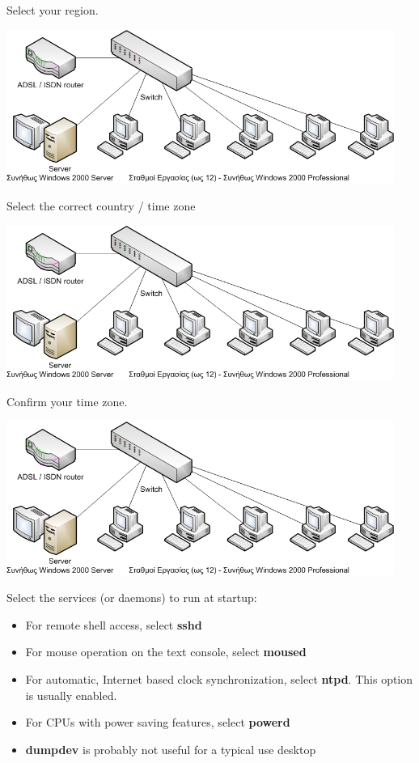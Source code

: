 \documentclass[a4paper,twoside,12pt]{article}
\begin{document}
Select your region.

\begin{center}
\includegraphics[width=0.95\textwidth]{images/main/school-lab}
\end{center}

Select the correct country / time zone

\begin{center}
\includegraphics[width=0.95\textwidth]{images/main/school-lab}
\end{center}

Confirm your time zone.

\begin{center}
\includegraphics[width=0.95\textwidth]{images/main/school-lab}
\end{center}

Select the services (or daemons) to run at startup:

\begin{itemize}
\item For remote shell access, select \textbf{sshd}
\item For mouse operation on the text console, select \textbf{moused}
\item For automatic, Internet based clock synchronization, select \textbf{ntpd}. This option is usually enabled.
\item For CPUs with power saving features, select \textbf{powerd}
\item \textbf{dumpdev} is probably not useful for a typical use desktop
\end{itemize}
\end{document}
